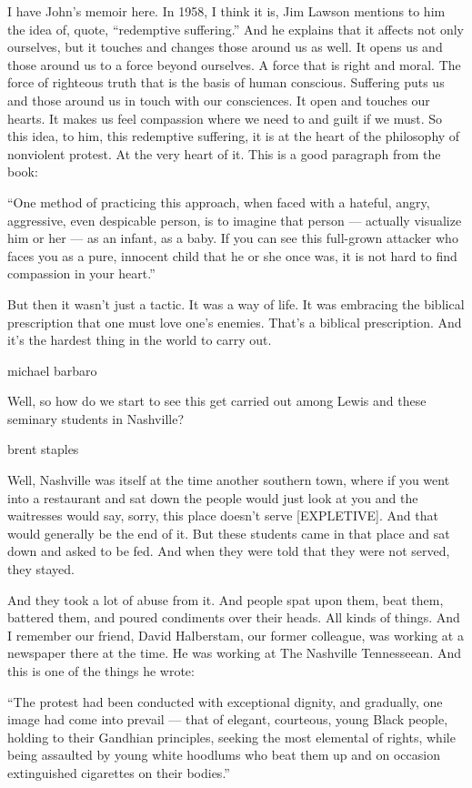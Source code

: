 I have John's memoir here. In 1958, I think it is, Jim Lawson mentions
to him the idea of, quote, ``redemptive suffering.'' And he explains
that it affects not only ourselves, but it touches and changes those
around us as well. It opens us and those around us to a force beyond
ourselves. A force that is right and moral. The force of righteous truth
that is the basis of human conscious. Suffering puts us and those around
us in touch with our consciences. It open and touches our hearts. It
makes us feel compassion where we need to and guilt if we must. So this
idea, to him, this redemptive suffering, it is at the heart of the
philosophy of nonviolent protest. At the very heart of it. This is a
good paragraph from the book:

``One method of practicing this approach, when faced with a hateful,
angry, aggressive, even despicable person, is to imagine that person ---
actually visualize him or her --- as an infant, as a baby. If you can
see this full-grown attacker who faces you as a pure, innocent child
that he or she once was, it is not hard to find compassion in your
heart.''

But then it wasn't just a tactic. It was a way of life. It was embracing
the biblical prescription that one must love one's enemies. That's a
biblical prescription. And it's the hardest thing in the world to carry
out.

michael barbaro

Well, so how do we start to see this get carried out among Lewis and
these seminary students in Nashville?

brent staples

Well, Nashville was itself at the time another southern town, where if
you went into a restaurant and sat down the people would just look at
you and the waitresses would say, sorry, this place doesn't serve
{[}EXPLETIVE{]}. And that would generally be the end of it. But these
students came in that place and sat down and asked to be fed. And when
they were told that they were not served, they stayed.

And they took a lot of abuse from it. And people spat upon them, beat
them, battered them, and poured condiments over their heads. All kinds
of things. And I remember our friend, David Halberstam, our former
colleague, was working at a newspaper there at the time. He was working
at The Nashville Tennesseean. And this is one of the things he wrote:

``The protest had been conducted with exceptional dignity, and
gradually, one image had come into prevail --- that of elegant,
courteous, young Black people, holding to their Gandhian principles,
seeking the most elemental of rights, while being assaulted by young
white hoodlums who beat them up and on occasion extinguished cigarettes
on their bodies.''

